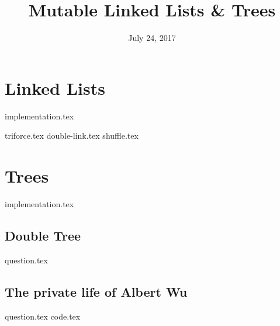 \documentclass{exam}
\title{Mutable Linked Lists \& Trees}
\date{July 24, 2017}
\begin{document}
\maketitle

\section{Linked Lists}
{implementation.tex}
\begin{questions}
{triforce.tex}
{double-link.tex}
{shuffle.tex}
\end{questions}

\clearpage

\section{Trees}
{implementation.tex}
\subsection*{Double Tree}
\begin{questions}
{question.tex}
\clearpage
\subsection*{The private life of Albert Wu}
{question.tex}
{code.tex}
\end{questions}
\end{document}
